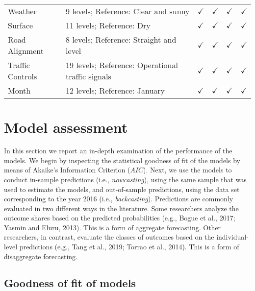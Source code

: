 \documentclass[]{elsarticle} %
\begin{document}
\begin{table}[!h]
{\begin{tabular}[t]{ll>{\raggedright\arraybackslash}p{6em}>{\raggedright\arraybackslash}p{6em}>{\raggedright\arraybackslash}p{6em}>{\raggedright\arraybackslash}p{6em}}
\rowcolor{gray!6}  \hspace{1em}Weather & 9 levels; Reference: Clear and sunny & $\checkmark$ & $\checkmark$ & $\checkmark$ & $\checkmark$\\
\hspace{1em}Surface & 11 levels; Reference: Dry & $\checkmark$ & $\checkmark$ & $\checkmark$ & $\checkmark$\\
\rowcolor{gray!6}  \hspace{1em}Road Alignment & 8 levels; Reference: Straight and level & $\checkmark$ & $\checkmark$ & $\checkmark$ & $\checkmark$\\
\hspace{1em}Traffic Controls & 19 levels; Reference: Operational traffic signals & $\checkmark$ & $\checkmark$ & $\checkmark$ & $\checkmark$\\
\rowcolor{gray!6}  \hspace{1em}Month & 12 levels; Reference: January & $\checkmark$ & $\checkmark$ & $\checkmark$ & $\checkmark$\\
\bottomrule
\end{tabular}}
\end{table}

\hypertarget{sec:assessment}{%
\section{Model assessment}\label{sec:assessment}}

In this section we report an in-depth examination of the performance of
the models. We begin by inspecting the statistical goodness of fit of
the models by means of Akaike's Information Criterion (\(AIC\)). Next,
we use the models to conduct in-sample predictions (i.e.,
\emph{nowcasting}), using the same sample that was used to estimate the
models, and out-of-sample predictions, using the data set corresponding
to the year 2016 (i.e., \emph{backcasting}). Predictions are commonly
evaluated in two different ways in the literature. Some researchers
analyze the outcome shares based on the predicted probabilities (e.g.,
Bogue et al., 2017; Yasmin and Eluru, 2013). This is a form of aggregate
forecasting. Other researchers, in contrast, evaluate the classes of
outcomes based on the individual-level predictions (e.g., Tang et al.,
2019; Torrao et al., 2014). This is a form of disaggregate forecasting.

\hypertarget{sec:goodness-of-fit}{%
\subsection{Goodness of fit of models}\label{sec:goodness-of-fit}}
\end{document}
